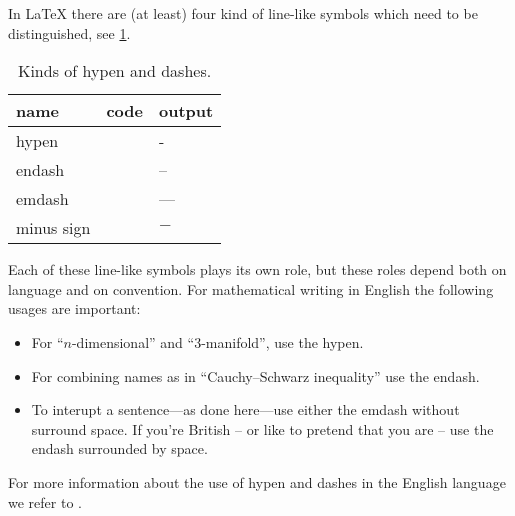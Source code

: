In {\LaTeX} there are (at least) four kind of line-like symbols which need to be distinguished, see \cref{dash list}.
\begin{table}[tb]
  \begin{center}
  \begin{tabular}{lll}
    \toprule
    \textbf{name}
    &
    \textbf{code}
    &
    \textbf{output}
    \\
    \midrule
    hypen
    &
    \inlinecode{-}
    &
    -
    \\
    endash
    &
    \inlinecode{--}
    &
    --
    \\
    emdash
    &
    \inlinecode{---}
    &
    ---
    \\
    minus sign
    &
    \inlinecode{\$-\$}
    &
    $-$
    \\
    \bottomrule
  \end{tabular}
  \end{center}
  \caption{Kinds of hypen and dashes.}
  \label{dash list}
\end{table}
Each of these line-like symbols plays its own role, but these roles depend both on language and on convention.
For mathematical writing in English the following usages are important:
\begin{itemize}
  \item
    For \enquote{$n$-dimensional} and \enquote{$3$-manifold}, use the hypen.
  \item
    For combining names as in \enquote{Cauchy--Schwarz inequality} use the endash.
  \item
    To interupt a sentence---as done here---use either the emdash without surround space.
    If you’re British -- or like to pretend that you are -- use the endash surrounded by space.
\end{itemize}
For more information about the use of hypen and dashes in the English language we refer to \cite[6.75--6.94]{chicago}.

